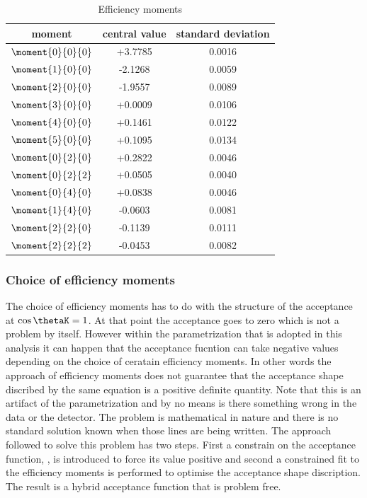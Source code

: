 \begin{table}[h]
  \centering 
  \caption{ Efficiency moments }
  \renewcommand{\arraystretch}{1.2}
  \label{eff_moms_table}
  \begin{tabular}{ccc}
    \hline
    moment & central value & standard deviation \\
    \hline
    $\moment{0}{0}{0}$ & +3.7785  & 0.0016 \\
    $\moment{1}{0}{0}$ & -2.1268  & 0.0059 \\
    $\moment{2}{0}{0}$ & -1.9557  & 0.0089 \\
    $\moment{3}{0}{0}$ & +0.0009  & 0.0106 \\    
    $\moment{4}{0}{0}$ & +0.1461  & 0.0122 \\
    $\moment{5}{0}{0}$ & +0.1095  & 0.0134 \\
    
    $\moment{0}{2}{0}$ & +0.2822  & 0.0046 \\
    $\moment{0}{2}{2}$ & +0.0505  & 0.0040 \\
    $\moment{0}{4}{0}$ & +0.0838  & 0.0046 \\

    $\moment{1}{4}{0}$ & -0.0603  & 0.0081 \\
    $\moment{2}{2}{0}$ & -0.1139  & 0.0111 \\
    $\moment{2}{2}{2}$ & -0.0453  & 0.0082 \\
\hline
  \end{tabular}
\end{table}  


\subsubsection{Choice of efficiency moments}
The choice of efficiency moments has to do with the structure of the acceptance at $\cos\thetaK=1$. At that point the acceptance goes to zero
which is not a problem by itself. However within the parametrization that is adopted in this analysis it can happen that the acceptance fucntion
 can take negative values depending on the choice of ceratain efficiency moments. In other words the approach of efficiency moments does
not guarantee that the acceptance shape discribed by the same equation is a positive definite quantity. Note that this is an artifact of the parametrization
and by no means is there something wrong in the data or the detector. The problem is mathematical in nature and there is no standard solution known
when those lines are being written. The approach followed to solve this problem has two steps. First a constrain on the acceptance function, , is 
introduced to force its value positive and second a constrained fit to the efficiency moments is performed to optimise the acceptance shape discription.
The result is a hybrid acceptance function that is problem free. 

